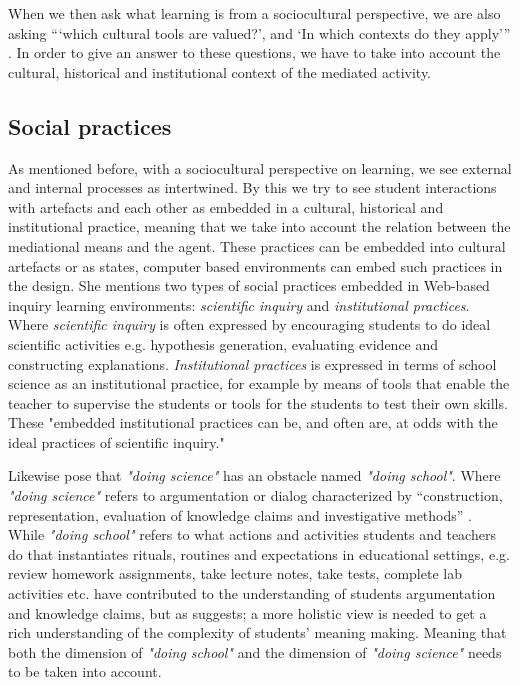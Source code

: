 When we then ask what learning is from a sociocultural perspective, we are also asking “‘which cultural tools are valued?’, and ‘In which contexts do they apply’” \citep{mifsud2010reconsidering}. In order to give an answer to these questions, we have to take into account the cultural, historical and institutional context of the mediated activity. 

\subsection{Social practices}
As mentioned before, with a sociocultural perspective on learning, we see external and internal processes as intertwined. By this we try to see student interactions with artefacts and each other as embedded in a cultural, historical and institutional practice, meaning that we take into account the relation between the mediational means and the agent. These practices can be embedded into cultural artefacts or as \citet{furberg2009socio} states, computer based environments can embed such practices in the design. She mentions two types of social practices embedded in Web-based inquiry learning environments: \emph{scientific inquiry} and \emph{institutional practices}.  Where \emph{scientific inquiry} is often expressed by encouraging students to do ideal scientific activities e.g. hypothesis generation, evaluating evidence and constructing explanations. \emph{Institutional practices} is expressed in terms of school science as an institutional practice, for example by means of tools that enable the teacher to supervise the students or tools for the students to test their own skills. These "embedded institutional practices can be, and often are, at odds with the ideal practices of scientific inquiry." \citetext{Cinn \& Malhotra 2002, referenced in \citealp{furberg2009socio}} 

Likewise \citet{jimenez2000doing} pose that \emph{"doing science"} has an obstacle named \emph{"doing school"}. Where \emph{"doing science"} refers to argumentation or dialog characterized by “construction, representation, evaluation of knowledge claims and investigative methods” \citep{jimenez2000doing}. While \emph{"doing school"} refers to what actions and activities students and teachers do that instantiates rituals, routines and expectations in educational settings, e.g. review homework assignments, take lecture notes, take tests, complete lab activities etc. \citeauthor{jimenez2000doing} have contributed to the understanding of students argumentation and knowledge claims, but as \citet*{furberg2008students} suggests; a more holistic view is needed to get a rich understanding of the complexity of students' meaning making. Meaning that both the dimension of \emph{"doing school"} and the dimension of \emph{"doing science"} needs to be taken into account. 

